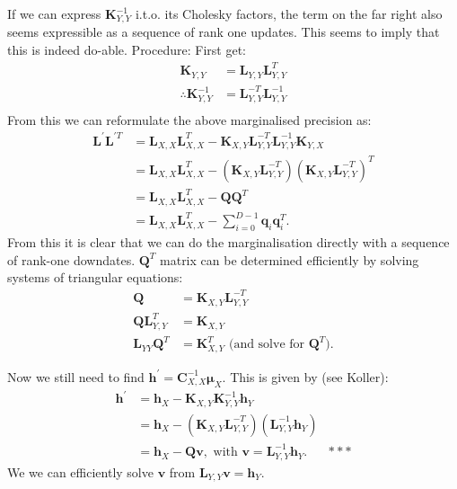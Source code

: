 \documentclass[oneside,english]{scrbook}
\begin{document}
  If we can express $\bm{K}_{Y,Y}^{-1}$ i.t.o. its Cholesky factors,
  the term on the far right also seems expressible as a sequence of
  rank one updates. This seems to imply that this is indeed do-able. Procedure:
  First get:
  \begin{align*}
    \bm{K}_{Y,Y} &= \bm{L}_{Y,Y}\bm{L}_{Y,Y}^{T} \\
    \therefore \bm{K}_{Y,Y}^{-1} &= \bm{L}_{Y,Y}^{-T}\bm{L}_{Y,Y}^{-1} \\
  \end{align*}
  From this we can reformulate the above marginalised precision as:
  \begin{align}
    \bm{L}^{'}\bm{L}^{'T}
    &= \bm{L}_{X,X}\bm{L}_{X,X}^T -
    \bm{K}_{X,Y}\bm{L}_{Y,Y}^{-T}\bm{L}_{Y,Y}^{-1}\bm{K}_{Y,X} \nonumber\\
    &= \bm{L}_{X,X}\bm{L}_{X,X}^T -
    (\bm{K}_{X,Y}\bm{L}_{Y,Y}^{-T})(\bm{K}_{X,Y}\bm{L}_{Y,Y}^{-T})^T \nonumber\\
    &= \bm{L}_{X,X}\bm{L}_{X,X}^T -
    \bm{Q}\bm{Q}^T \nonumber\\
    &= \bm{L}_{X,X}\bm{L}_{X,X}^T -
    \sum_{i=0}^{D-1}\bm{q}_{i}\bm{q}_{i}^{T}.
  \end{align}
From this it is clear that we can do the marginalisation directly with
a sequence of rank-one downdates. $\bm{Q}^T$ matrix can
be determined efficiently by solving systems of triangular equations:
\begin{align}
  \bm{Q} &= \bm{K}_{X,Y}\bm{L}_{Y,Y}^{-T} \nonumber\\
  \bm{Q}\bm{L}_{Y,Y}^T &= \bm{K}_{X,Y} \nonumber\\
  \bm{L}_{YY}\bm{Q}^T &= \bm{K}_{X,Y}^T              \text{ (and solve for $\bm{Q}^T$)}.
\end{align}

Now we still need to find $\bm{h}^{'} =
\bm{C}_{X,X}^{-1}\bm{\mu}_X$. This is given by (see Koller):
\begin{align*}
  \bm{h}^{'} &= \bm{h}_X - \bm{K}_{X,Y}\bm{K}_{Y,Y}^{-1}\bm{h}_Y \\
  &= \bm{h}_X - (\bm{K}_{X,Y}\bm{L}_{Y,Y}^{-T})(\bm{L}_{Y,Y}^{-1}\bm{h}_Y) \\
  &= \bm{h}_X - \bm{Q}\bm{v}, \text{ with } \bm{v} = \bm{L}_{Y,Y}^{-1}\bm{h}_Y. & ***
\end{align*}
We we can efficiently solve $\bm{v}$ from $\bm{L}_{Y,Y}\bm{v} = \bm{h}_Y$.
\end{document}
